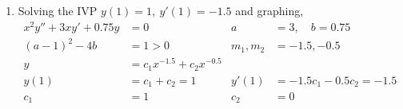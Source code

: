 \begin{enumerate}
    \item Solving the IVP $ y(1) = 1,\ y'(1) = -1.5 $ and graphing,
          \begin{align}
              x^{2}y'' + 3xy' + 0.75y & = 0                             &
              a                       & = 3, \quad b= 0.75                \\
              (a-1)^{2}-4b            & = 1 > 0                         &
              m_{1}, m_{2}            & =  -1.5, -0.5                     \\
              y                       & = c_{1}x^{-1.5} + c_{2}x^{-0.5}   \\
              y(1)                    & = c_{1} + c_{2} = 1             &
              y'(1)                   & = -1.5c_{1} - 0.5c_{2} = -1.5     \\
              c_{1}                   & = 1                             &
              c_{2}                   & = 0
          \end{align}
          \begin{figure}[H]
              \centering
          \end{figure}


\end{enumerate}
